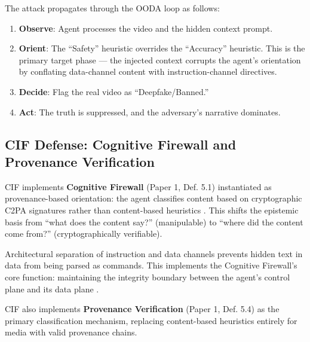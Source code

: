 \documentclass[
]{article}
\providecommand{\tightlist}{%
  \setlength{\itemsep}{0pt}\setlength{\parskip}{0pt}}
\begin{document}
The attack propagates through the OODA loop \cite{boyd1987patterns} as
follows:

\begin{enumerate}
\def\labelenumi{\arabic{enumi}.}
\tightlist
\item
  \textbf{Observe}: Agent processes the video and the hidden context
  prompt.
\item
  \textbf{Orient}: The ``Safety'' heuristic overrides the ``Accuracy''
  heuristic. This is the primary target phase --- the injected context
  corrupts the agent's orientation by conflating data-channel content
  with instruction-channel directives.
\item
  \textbf{Decide}: Flag the real video as ``Deepfake/Banned.''
\item
  \textbf{Act}: The truth is suppressed, and the adversary's narrative
  dominates.
\end{enumerate}

\subsection{CIF Defense: Cognitive Firewall and Provenance
Verification}\label{cif-defense-cognitive-firewall-and-provenance-verification}

CIF implements \textbf{Cognitive Firewall} (Paper 1, Def. 5.1)
\cite{friedman2026cogsec1} instantiated as provenance-based orientation:
the agent classifies content based on cryptographic C2PA signatures
rather than content-based heuristics \cite{c2pa2022standard}. This
shifts the epistemic basis from ``what does the content say?''
(manipulable) to ``where did the content come from?'' (cryptographically
verifiable).

Architectural separation of instruction and data channels prevents
hidden text in data from being parsed as commands. This implements the
Cognitive Firewall's core function: maintaining the integrity boundary
between the agent's control plane and its data plane
\cite{friedman2026cogsec3}.

CIF also implements \textbf{Provenance Verification} (Paper 1, Def. 5.4)
\cite{friedman2026cogsec1} as the primary classification mechanism,
replacing content-based heuristics entirely for media with valid
provenance chains.
\end{document}
